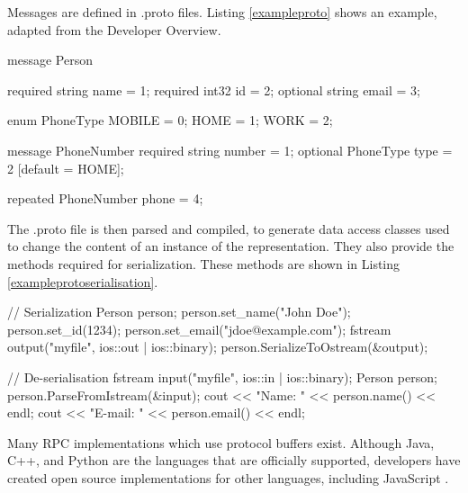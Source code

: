 \begin{description}
	Messages are defined in .proto files. Listing \ref{exampleproto} shows an example, adapted from the Developer Overview.
	~\\

	\begin{code}
message Person {
  required string name = 1;
  required int32 id = 2;
  optional string email = 3;

  enum PhoneType {
    MOBILE = 0;
    HOME = 1;
    WORK = 2;
  }

  message PhoneNumber {
    required string number = 1;
    optional PhoneType type = 2 [default = HOME];
  }

  repeated PhoneNumber phone = 4;
}
	\end{code}

	The .proto file is then parsed and compiled, to generate data access classes used to change the content of an instance of the representation. They also provide the methods required for serialization. These methods are shown in Listing \ref{exampleprotoserialisation}.

	\begin{code}
// Serialization
Person person;
person.set_name("John Doe");
person.set_id(1234);
person.set_email("jdoe@example.com");
fstream output("myfile", ios::out | ios::binary);
person.SerializeToOstream(&output);

// De-serialisation 
fstream input("myfile", ios::in | ios::binary);
Person person;
person.ParseFromIstream(&input);
cout << "Name: " << person.name() << endl;
cout << "E-mail: " << person.email() << endl;
	\end{code}


	Many RPC implementations which use protocol buffers exist. Although Java, C++, and Python are the languages that are officially supported, developers have created open source  implementations for other languages, including JavaScript \cite{protobufjs}.
\end{description}

